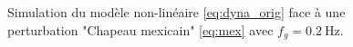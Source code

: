 \begin{figure}[ht!]
    \centering
    \caption{Simulation du modèle non-linéaire \eqref{eq:dyna_orig} face à une perturbation "Chapeau mexicain" \eqref{eq:mex} avec $f_g = \SI{0.2}{\Hz}$.}
    \label{fig:sim_mex0_2}
\end{figure}


